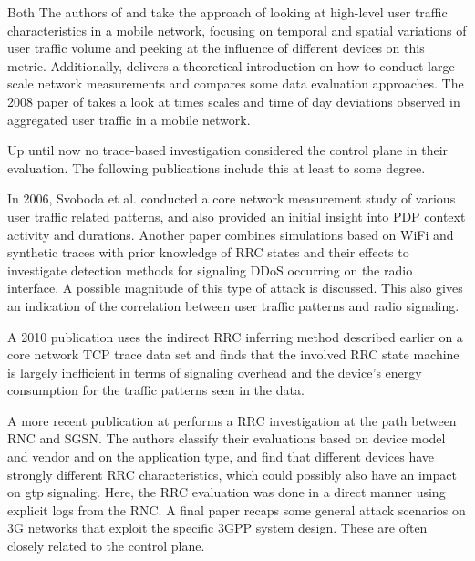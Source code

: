 Both The authors of \cite{shafiq2011characterizing} and \cite{paul2011understanding} take the approach of looking at high-level user traffic characteristics in a mobile network, focusing on temporal and spatial variations of user traffic volume and peeking at the influence of different devices on this metric. Additionally, \cite{baer2011two} delivers a theoretical introduction on how to conduct large scale network measurements and compares some data evaluation approaches. The 2008 paper of \cite{4570772} takes a look at times scales and time of day deviations observed in aggregated user traffic in a mobile network.

Up until now no trace-based investigation considered the control plane in their evaluation. The following publications include this at least to some degree.

In 2006, Svoboda et al. \cite{svoboda2006composition} conducted a core network measurement study of various user traffic related patterns, and also provided an initial insight into \gls{PDP} context activity and durations. Another paper \cite{lee2007detection} combines simulations based on WiFi and synthetic traces with prior knowledge of \gls{RRC} states and their effects to investigate detection methods for signaling \gls{DDoS} occurring on the radio interface. A possible magnitude of this type of attack is discussed. This also gives an indication of the correlation between user traffic patterns and radio signaling.

A 2010 publication\cite{Qian:2010:CRR:1879141.1879159} uses the indirect \gls{RRC} inferring method described earlier on a core network \gls{TCP} trace data set and finds that the involved \gls{RRC} state machine is largely inefficient in terms of signaling overhead and the device's energy consumption for the traffic patterns seen in the data. 

A more recent publication at \cite{he2012panoramic} performs a \gls{RRC} investigation at the path between \gls{RNC} and \gls{SGSN}. The authors classify their evaluations based on device model and vendor and on the application type, and find that different devices have strongly different \gls{RRC} characteristics, which could possibly also have an impact on \gls{gtp} signaling. Here, the \gls{RRC} evaluation was done in a direct manner using explicit logs from the \gls{RNC}. A final paper \cite{Ricciato2010551} recaps some general attack scenarios on \gls{3G} networks that exploit the specific \gls{3GPP} system design. These are often closely related to the control plane.


